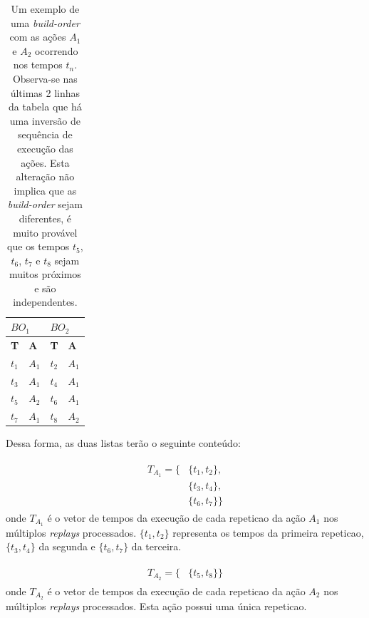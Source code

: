 \begin{table}[H]
\centering
\caption{Um exemplo de uma \textit{\gls{build-order}} com as ações $A_1$ e $A_2$ ocorrendo nos tempos $t_n$. Observa-se nas últimas 2 linhas da tabela que há uma inversão de sequência de execução das ações. Esta alteração não implica que as \textit{\gls{build-order}} sejam diferentes, é muito provável que os tempos $t_5$, $t_6$, $t_7$ e $t_8$ sejam muitos próximos e são independentes.}
\label{my-label}
\begin{tabular}{|l|l||l|l|}
\hline
\multicolumn{2}{|l||}{\centering $BO_1$} & \multicolumn{2}{l|}{\centering $BO_2$} \\ \hline
\textbf{T}  & \textbf{A}  & \textbf{T}  & \textbf{A} \\ \hline
$t_1$       & $A_1$       & $t_2$       & $A_1$      \\ \hline
$t_3$       & $A_1$       & $t_4$       & $A_1$      \\ \hline
$t_5$       & $A_2$       & $t_6$       & $A_1$      \\ \hline
$t_7$       & $A_1$       & $t_8$       & $A_2$      \\ \hline
\end{tabular}
\end{table}

Dessa forma, as duas listas terão o seguinte conteúdo:

\begin{align}
\begin{split}
    T_{A_1} = \{
		&\{t_1, t_2\}, 		\\
		&\{t_3, t_4\}, 		\\
		&\{t_6, t_7\}
	\}
\end{split}
\label{eq:metodo-exemplo-vetor-tempos-a1}
\end{align}
\noindent onde $T_{A_1}$ é o vetor de tempos da execução de cada \gls{repeticao} da ação $A_1$ nos múltiplos \textit{\glspl{replay}} processados. $\{t_1, t_2\}$ representa os tempos da primeira \gls{repeticao}, $\{t_3, t_4\}$ da segunda e $\{t_6, t_7\}$ da terceira.

\begin{align}
\begin{split}
    T_{A_2} = \{
		&\{t_5, t_8\}
	\}
\end{split}
\label{eq:metodo-exemplo-vetor-tempos-a2}
\end{align}
\noindent onde $T_{A_2}$ é o vetor de tempos da execução de cada \gls{repeticao} da ação $A_2$ nos múltiplos \textit{\glspl{replay}} processados. Esta ação possui uma única \gls{repeticao}.

